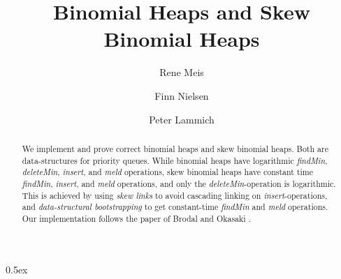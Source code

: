 \documentclass[11pt,a4paper]{article}
\begin{document}
\title{Binomial Heaps and Skew Binomial Heaps}
\author{Rene Meis \and Finn Nielsen \and Peter Lammich}
\maketitle

\begin{abstract}
  We implement and prove correct binomial heaps and skew binomial heaps.
  Both are data-structures for priority queues.
  While binomial heaps have logarithmic {\em findMin}, {\em deleteMin}, 
  {\em insert}, and {\em meld }
  operations,
  skew binomial heaps have constant time {\em findMin}, {\em insert}, 
  and {\em meld} operations,
  and only the {\em deleteMin}-operation is logarithmic. This is achieved by
  using {\em skew links} to avoid cascading linking on {\em insert}-operations,
  and {\em data-structural bootstrapping} to get constant-time {\em findMin}
  and {\em meld} operations.
  Our implementation follows the paper of Brodal and Okasaki \cite{BrOk96}.
\end{abstract}

\clearpage

\tableofcontents

\parindent 0pt\parskip 0.5ex





\end{document}
